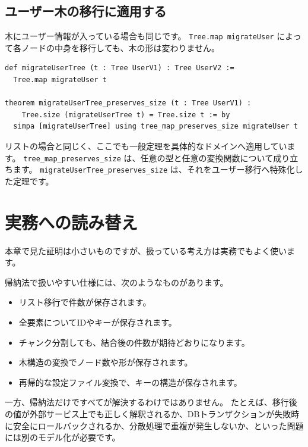 \subsection{ユーザー木の移行に適用する}

木にユーザー情報が入っている場合も同じです。
\texttt{Tree.map migrateUser} によって各ノードの中身を移行しても、木の形は変わりません。

\begin{listing}[htbp]
\begin{verbatim}
def migrateUserTree (t : Tree UserV1) : Tree UserV2 :=
  Tree.map migrateUser t

theorem migrateUserTree_preserves_size (t : Tree UserV1) :
    Tree.size (migrateUserTree t) = Tree.size t := by
  simpa [migrateUserTree] using tree_map_preserves_size migrateUser t
\end{verbatim}
\caption{\texttt{migrateUserTree\_preserves\_size}}
\label{lst:induction-migrate-tree}
\end{listing}

リストの場合と同じく、ここでも一般定理を具体的なドメインへ適用しています。
\texttt{tree\_map\_}\allowbreak\texttt{preserves\_size} は、任意の型と任意の変換関数について成り立ちます。
\texttt{migrateUserTree\_}\allowbreak\texttt{preserves\_size} は、それをユーザー移行へ特殊化した定理です。

\section{実務への読み替え}

本章で見た証明は小さいものですが、扱っている考え方は実務でもよく使います。

帰納法で扱いやすい仕様には、次のようなものがあります。
\begin{itemize}
\item リスト移行で件数が保存されます。
\item 全要素についてIDやキーが保存されます。
\item チャンク分割しても、結合後の件数が期待どおりになります。
\item 木構造の変換でノード数や形が保存されます。
\item 再帰的な設定ファイル変換で、キーの構造が保存されます。
\end{itemize}

一方、帰納法だけですべてが解決するわけではありません。
たとえば、移行後の値が外部サービス上でも正しく解釈されるか、DBトランザクションが失敗時に安全にロールバックされるか、分散処理で重複が発生しないか、といった問題には別のモデル化が必要です。

